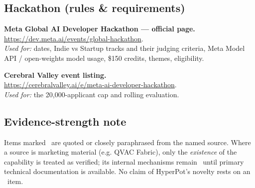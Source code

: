 \subsection{Hackathon (rules \& requirements)}
\begin{enumerate}[leftmargin=1.8em,label={[H\arabic*]}]
  \item \textbf{Meta Global AI Developer Hackathon --- official page.} \\
  \url{https://dev.meta.ai/events/global-hackathon}. \\
  \emph{Used for:} dates, Indie vs Startup tracks and their judging criteria,
  Meta Model API / open-weights model usage, \$150 credits, themes, eligibility. \VER

  \item \textbf{Cerebral Valley event listing.} \\
  \url{https://cerebralvalley.ai/e/meta-ai-developer-hackathon}. \\
  \emph{Used for:} the 20,000-applicant cap and rolling evaluation. \VER
\end{enumerate}

\subsection{Evidence-strength note}
Items marked \VER\ are quoted or closely paraphrased from the named source.
Where a source is marketing material (e.g. QVAC Fabric), only the
\emph{existence} of the capability is treated as verified; its internal
mechanisms remain \UNK\ until primary technical documentation is available. No
claim of HyperPot's novelty rests on an \UNK\ item.

